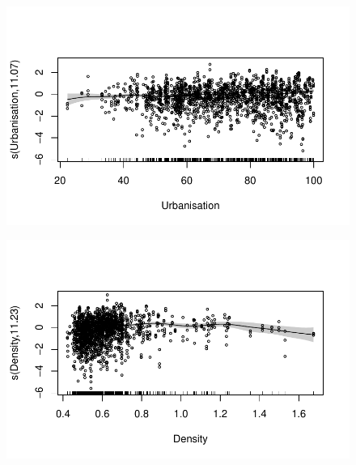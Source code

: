 \documentclass[
  letterpaper,
  DIV=11,
  numbers=noendperiod]{scrartcl}
\begin{document}
\begin{figure}[H]

{\centering \includegraphics{Group34Coursework_files/figure-pdf/unnamed-chunk-15-3.pdf}

}

\end{figure}

\begin{figure}[H]

{\centering \includegraphics{Group34Coursework_files/figure-pdf/unnamed-chunk-15-4.pdf}

}

\end{figure}
\end{document}
